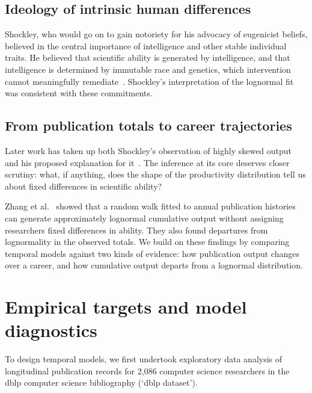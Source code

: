 \documentclass{article}
\begin{document}
\subsection*{Ideology of intrinsic human differences}\label{subsec:intro_eugenics}
Shockley, who would go on to gain notoriety for his advocacy of eugenicist beliefs, believed in the central importance of intelligence and other stable individual traits. He believed that scientific ability is generated by intelligence, and that intelligence is determined by immutable race and genetics, which intervention cannot meaningfully remediate~\cite{shockley_lectures_on_eugenics_and_research_taboos1967, shockley_public_hereditarian_and_eugenic_views1965, shockley_later_self_explanation_of_hereditarian_views1980}. Shockley's interpretation of the lognormal fit was consistent with these commitments. 

\subsection*{From publication totals to career trajectories}\label{subsec:intro_tots-to-trajs}
Later work has taken up both Shockley's observation of highly skewed output and his proposed explanation for it~\cite{called_shockley_elegant,shockley_in_modern_science_of_science_wang2021}. The inference at its core deserves closer scrutiny: what, if anything, does the shape of the productivity distribution tell us about fixed differences in scientific ability?

Zhang et al.~\cite{random_walk_reproduces_productivity_trajectories_zhang2026}
showed that a random walk fitted to annual publication histories can
generate approximately lognormal cumulative output without assigning
researchers fixed differences in ability. They also found departures
from lognormality in the observed totals. We build on these findings
by comparing temporal models against two kinds of evidence: how
publication output changes over a career, and how cumulative output
departs from a lognormal distribution.

\section{Empirical targets and model diagnostics}\label{sec:empirical_constraints}
To design temporal models, we first undertook exploratory data analysis of longitudinal publication records for 2,086 computer science researchers in the dblp computer science bibliography (`dblp dataset'). 
\end{document}
